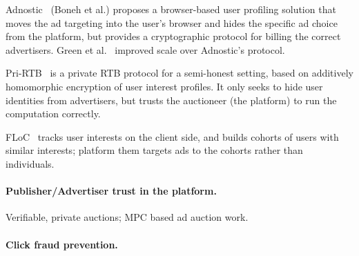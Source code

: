 %
Adnostic~\cite{adnostic} (Boneh et al.) proposes a browser-based user profiling
solution that moves the ad targeting into the user's browser and hides the
specific ad choice from the platform, but provides a cryptographic protocol for
billing the correct advertisers.
%
Green et al.~\cite{adnostic+} improved scale over Adnostic's protocol.
%

Pri-RTB~\cite{pri-rtb} is a private RTB protocol for a semi-honest setting,
based on additively homomorphic encryption of user interest profiles.
%
It only seeks to hide user identities from advertisers, but trusts the
auctioneer (the platform) to run the computation correctly.
%

%
FLoC~\cite{floc} tracks user interests on the client side, and builds cohorts of
users with similar interests; platform them targets ads to the cohorts rather
than individuals.
%

\paragraph{Publisher/Advertiser trust in the platform.}

%
Verifiable, private auctions; MPC based ad auction work.
%

\paragraph{Click fraud prevention.}
%
%

